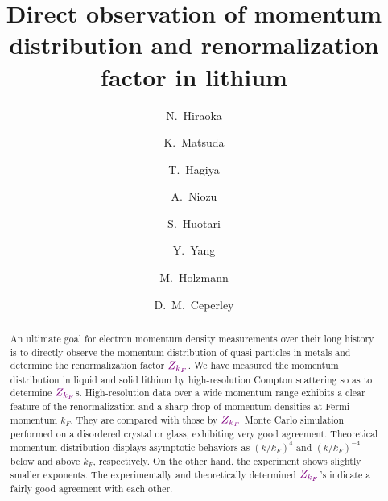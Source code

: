 \documentclass[twocolumn,showpacs,showkeys,fleqn,prl,superscriptaddress]{revtex4}%
\begin{document}

\title{
Direct observation of momentum distribution and renormalization factor in lithium
}

\author{ 
N.~Hiraoka
}

\author{ 
K.~Matsuda
}

\author{ 
T.~Hagiya
}
  
\author{ 
A.~Niozu
}


\author{ 
S.~Huotari
}

\author{ 
Y.~Yang
}

\author{ 
M.~Holzmann
}

\author{ 
D.~M.~Ceperley
}







\date{}
\begin{abstract}

An ultimate goal for electron momentum density measurements over their long history is to directly observe the momentum distribution of quasi particles in metals and determine the renormalization factor ${\color{violet}Z_{k_F}}$.
We have measured the momentum distribution in liquid and solid lithium by high-resolution Compton scattering so as to determine ${\color{violet}Z_{k_F}}$s.
High-resolution data over a wide momentum range exhibits a clear feature of the renormalization and a sharp drop of momentum densities at Fermi momentum $k_F$.
They are compared with those by ${\color{violet}Z_{k_F}}$ Monte Carlo simulation performed on a disordered crystal or glass, exhibiting very good agreement.        
Theoretical momentum distribution displays asymptotic behaviors as $(k/k_F)^4$ and $(k/k_F)^{-4}$ below and above $k_F$, respectively.
On the other hand, the experiment shows slightly smaller exponents. 
The experimentally and theoretically determined ${\color{violet}Z_{k_F}}$’s indicate a fairly good agreement with each other.


\end{abstract}
\maketitle
\end{document}
